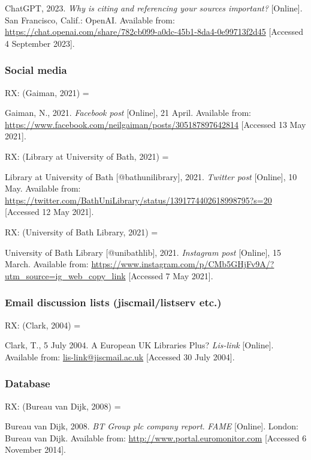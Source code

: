 ChatGPT, 2023. \emph{Why is citing and referencing your sources important?} [Online]. San Francisco, Calif.: OpenAI. Available from: \url{https://chat.openai.com/share/782cb099-a0dc-45b1-8da4-0e99713f2d45} [Accessed 4 September 2023].



\subsubsection*{Social media}

RX: (Gaiman, 2021) = \cite{gaiman2021fbp}

Gaiman, N., 2021. \emph{Facebook post} [Online], 21 April. Available from: \url{https://www.facebook.com/neilgaiman/posts/305187897642814} [Accessed 13 May 2021].


RX: (Library at University of Bath, 2021) = \cite{ublib2021tp}

Library at University of Bath [@bathunilibrary], 2021. \emph{Twitter post} [Online], 10 May. Available from: \url{https://twitter.com/BathUniLibrary/status/1391774402618998795?s=20} [Accessed 12 May 2021].


RX: (University of Bath Library, 2021) = \cite{ublib2021ip}

University of Bath Library [@unibathlib], 2021. \emph{Instagram post} [Online], 15 March. Available from: \url{https://www.instagram.com/p/CMb5GHjFv9A/?utm_source=ig_web_copy_link} [Accessed 7 May 2021].



\subsubsection*{Email discussion lists (jiscmail\slash listserv etc.)}

RX: (Clark, 2004) = \cite{clark2004euk}

Clark, T., 5 July 2004. A European UK Libraries Plus? \emph{Lis-link} [Online]. Available from: \url{lis-link@jiscmail.ac.uk} [Accessed 30 July 2004].



\subsubsection*{Database}

RX: (Bureau van Dijk, 2008) = \cite{bvd2008bt}

Bureau van Dijk, 2008. \emph{BT Group plc company report}. \emph{FAME} [Online]. London: Bureau van Dijk. Available from: \url{http://www.portal.euromonitor.com} [Accessed 6 November 2014].



